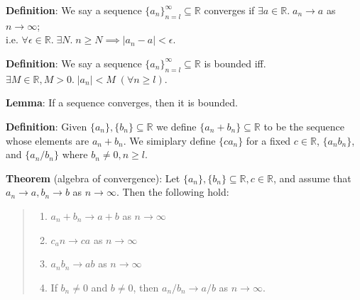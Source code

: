 \documentclass[11pt]{article}
\begin{document}
\textbf{Definition}: We say a sequence $\{a_n\}_{n=l}^{\infty} \subseteq \mathbb{R}$ converges if $\exists a \in \mathbb{R}.\; a_n \to a$ as $n \to \infty$;\\
i.e. $\forall \epsilon \in \mathbb{R}.\; \exists N.\; n \geq N \implies |a_n - a| < \epsilon$.

\textbf{Definition}: We say a sequence $\{a_n\}_{n=l}^{\infty} \subseteq \mathbb{R}$ is bounded iff. $\exists M \in \mathbb{R}, M > 0.\; |a_n| < M \;(\forall n \geq l)$.

\textbf{Lemma}: If a sequence converges, then it is bounded.

\textbf{Definition}: Given $\{a_n\}, \{b_n\} \subseteq \mathbb{R}$ we define $\{a_n + b_n\} \subseteq \mathbb{R}$ to be the sequence whose elements are $a_n + b_n$. We simiplary define $\{ca_n\}$ for a fixed $c \in \mathbb{R}$, $\{a_nb_n\}$, and $\{a_n/b_n\}$ where $b_n \neq 0, n \geq l$.

\textbf{Theorem} (algebra of convergence): Let $\{a_n\}, \{b_n\} \subseteq \mathbb{R}, c \in \mathbb{R}$, and assume that $a_n \to a, b_n \to b$ as $n \to \infty$. Then the following hold:
\begin{quote}\vspace{-0.3cm}
	\begin{enumerate}
	\item $a_n + b_n \to a + b$ as $n \to \infty$
	\item $c_an \to ca$ as $n \to \infty$
	\item $a_nb_n \to ab$ as $n \to \infty$
	\item If $b_n \neq 0$ and $b \neq 0$, then $a_n/b_n \to a/b$ as $n \to \infty$.
	\end{enumerate}
\end{quote}
\end{document}

